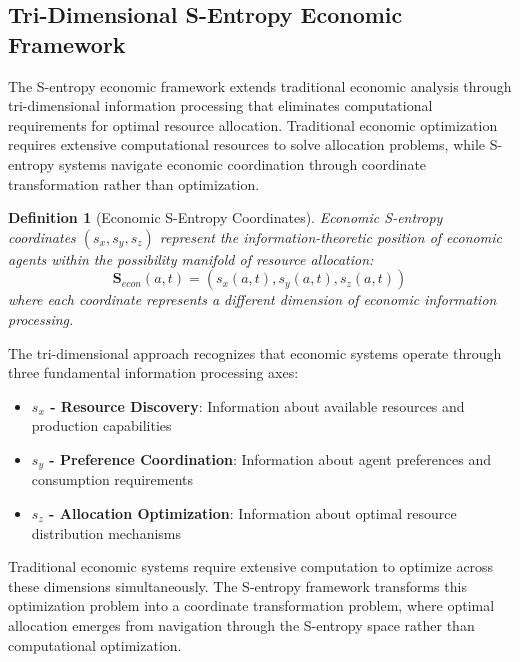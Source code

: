 \documentclass[12pt,a4paper]{article}
\newtheorem{definition}[theorem]{Definition}
\begin{document}
\subsection{Tri-Dimensional S-Entropy Economic Framework}

The S-entropy economic framework extends traditional economic analysis through tri-dimensional information processing that eliminates computational requirements for optimal resource allocation. Traditional economic optimization requires extensive computational resources to solve allocation problems, while S-entropy systems navigate economic coordination through coordinate transformation rather than optimization.

\begin{definition}[Economic S-Entropy Coordinates]
Economic S-entropy coordinates $(s_x, s_y, s_z)$ represent the information-theoretic position of economic agents within the possibility manifold of resource allocation:
\begin{equation}
\mathbf{S}_{econ}(a,t) = (s_x(a,t), s_y(a,t), s_z(a,t))
\end{equation}
where each coordinate represents a different dimension of economic information processing.
\end{definition}

The tri-dimensional approach recognizes that economic systems operate through three fundamental information processing axes:
\begin{itemize}
\item \textbf{$s_x$ - Resource Discovery}: Information about available resources and production capabilities
\item \textbf{$s_y$ - Preference Coordination}: Information about agent preferences and consumption requirements  
\item \textbf{$s_z$ - Allocation Optimization}: Information about optimal resource distribution mechanisms
\end{itemize}

Traditional economic systems require extensive computation to optimize across these dimensions simultaneously. The S-entropy framework transforms this optimization problem into a coordinate transformation problem, where optimal allocation emerges from navigation through the S-entropy space rather than computational optimization.
\end{document}
